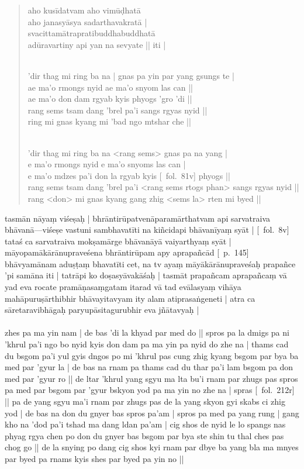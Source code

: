 \documentclass[12pt]{article}
\newcommand{\emdash} {\hspace{0em}—\hspace{0em}}
\begin{document}
\begin{quote}
	aho kusīdatvam aho vimūḍhatā\\
	aho janasyāsya sadarthavakratā |\\
	svacittamātrapratibuddhabuddhatā\\
	adūravartiny api yan na sevyate || iti |

	\textbf{\TVA}\\
	'dir thag mi ring ba na | gnas pa yin par yang gsungs te |\\
	ae ma'o rmongs nyid ae ma'o snyom las can || \\
	ae ma'o don dam rgyab kyis phyogs 'gro 'di || \\
	rang sems tsam dang 'brel pa'i sangs rgyas nyid || \\
	ring mi gnas kyang mi 'bad ngo mtshar che || 

	\textbf{\TVB}\\
	'dir thag mi ring ba na <rang sems> gnas pa na yang |\\
	e ma'o rmongs nyid e ma'o snyoms las can |\\
	e ma'o mdzes pa'i don la rgyab kyis [\TVB\ fol.\ 81v] phyogs || \\
	rang sems tsam dang 'brel pa'i <rang sems rtogs phan> sangs rgyas nyid || \\
	rang <don> mi gnas kyang gang zhig <sems la> rten mi byed || 
\end{quote}


tasmān nāyaṃ viśeṣaḥ | bhrāntirūpatvenāparamārthatvam api sarvatraiva bhāvanā\emdash viśeṣe vastuni sambhavatīti na kiñcidapi bhāvanīyaṃ syāt | [\MS\ fol.\ 8v] tataś ca sarvatraiva mokṣamārge bhāvanāyā vaiyarthyaṃ syāt | māyopamākārānupraveśena bhrāntirūpam apy aprapañcād [\EDD\ p.\ 145] bhāvyamānam aduṣṭaṃ bhavatīti cet, na tv ayaṃ māyākārānupraveśaḥ prapañce 'pi samāna iti | tatrāpi ko doṣasyāvakāśaḥ | tasmāt prapañcam aprapañcaṃ vā yad eva rocate pramāṇasaṃgatam itarad vā tad evālasyaṃ vihāya mahāpuruṣārthibhir bhāvayitavyam ity alam atiprasaṅgeneti | atra ca sāretaravibhāgaḥ paryupāsitagurubhir eva jñātavyaḥ |\\

\textbf{\TVA}\\
zhes pa ma yin nam | de bas 'di la khyad par med do || spros pa la dmigs pa ni 'khrul pa'i ngo bo nyid kyis don dam pa ma yin pa nyid do zhe na | thams cad du bsgom pa'i yul gyis dngos po mi 'khrul pas cung zhig kyang bsgom par bya ba med par 'gyur la | de bas na rnam pa thams cad du thar pa'i lam bsgom pa don med par 'gyur ro || de ltar 'khrul yang sgyu ma lta bu'i rnam par zhugs pas spros pa med par bsgom par 'gyur bskyon yod pa ma yin no zhe na | spras [\TVA\ fol.\ 212r] || pa de yang sgyu ma'i rnam par zhugs pas de la yang skyon gyi skabs ci zhig yod | de bas na don du gnyer bas spros pa'am | spros pa med pa yang rung | gang kho na 'dod pa'i tshad ma dang ldan pa'am | cig shos de nyid le lo spangs nas phyag rgya chen po don du gnyer bas bsgom par bya ste shin tu thal ches pas chog go || de la snying po dang cig shos kyi rnam par dbye ba yang bla ma mnyes par byed pa rnams kyis shes par byed pa yin no || \\
\end{document}
